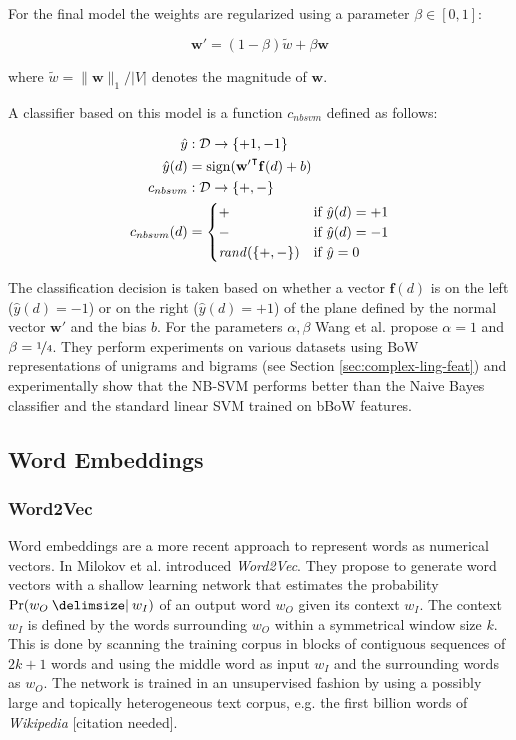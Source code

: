 For the final model the weights are regularized using a parameter
$\beta \in [0,1]$:

\begin{equation*}
\mathbf{w'} = (1-\beta)\tilde{w} + \beta\mathbf{w}
\end{equation*}

where $\tilde{w} = \lVert \mathbf{w} \rVert_1/\lvert V \rvert$ denotes the
magnitude of $\mathbf{w}$.

A classifier based on this model is a function $c_{nbsvm}$ defined as follows:

\begin{equation*}
\begin{split}
\hat{y} &: \mathcal{D} \to \{+1,-1\} \\
\hat{y}(d) &= \operatorname{sign}(\mathbf{w'}^\intercal \mathbf{f}(d) + b) \\
c_{nbsvm} &: \mathcal{D} \to \{+,-\} \\
c_{nbsvm}(d) &= \begin{cases} + & \text{if~} \hat{y}(d) = +1 \\ - & \text{if~}
\hat{y}(d) = -1 \\ \mathit{rand}(\{+, -\}) & \text{if~} \hat{y} = 0\end{cases}
\end{split}
\end{equation*}

The classification decision is taken based on whether a vector $\mathbf{f}(d)$
is on the left ($\hat{y}(d) = -1$) or on the right ($\hat{y}(d) = +1$) of the
plane defined by the normal vector $\mathbf{w'}$ and the bias $b$. For the
parameters $\alpha, \beta$ Wang et al. propose $\alpha = 1$ and $\beta =
\nicefrac{1}{4}$.
They perform experiments on various datasets using BoW representations
of unigrams and bigrams (see Section \ref{sec:complex-ling-feat}) and
experimentally show that the NB-SVM performs better than the Naive Bayes classifier and the standard linear SVM trained on bBoW features.

\subsection{Word Embeddings}

\subsubsection{Word2Vec}
Word embeddings are a more recent approach to represent words as numerical
vectors. In \cite{mikolov2013distributed} Milokov et al. introduced
\textit{Word2Vec}. They propose to generate word vectors with a shallow learning
network that estimates the probability $\Pr(w_O\given w_I)$ of an output word
$w_O$ given its context $w_I$. The context $w_I$ is defined by the words
surrounding $w_O$ within a symmetrical window size $k$. This is done by scanning
the training corpus in blocks of contiguous sequences of $2k + 1$ words and
using the middle word as input $w_I$ and the surrounding words as $w_O$. The network is trained in an 
unsupervised fashion by using a possibly large and topically heterogeneous text
corpus, e.g. the first billion words of \emph{Wikipedia} [citation needed].

